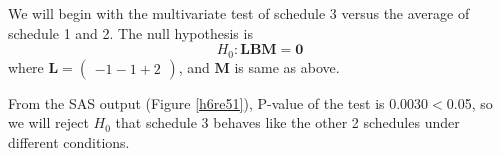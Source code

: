 \documentclass[letterpaper, 12pt]{article}
\newcommand{\lma}{\left(\begin{matrix}}
\newcommand{\rma}{\end{matrix}\right)}
\begin{document}
We will begin with the multivariate test of schedule 3 versus the average of schedule 1 and 2. The null hypothesis is
$$
H_0:\bm{LBM}=\bm{0}
$$
where $\bm{L}=\lma -1 -1 +2\rma$, and $\bm{M}$ is same as above.

From the SAS output (Figure \ref{h6re51}), P-value of the test is 0.0030$<$0.05, so we will reject $H_0$ that schedule 3 behaves like the other 2 schedules under different conditions.





\end{document}
